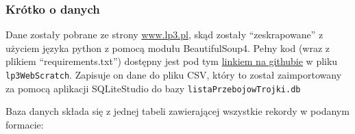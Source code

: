 \documentclass[11pt]{article}
\begin{document}
\hypertarget{kruxf3tko-o-danych}{%
\subsubsection{Krótko o danych}\label{kruxf3tko-o-danych}}

Dane zostały pobrane ze strony \href{https://www.lp3.pl/}{www.lp3.pl},
skąd zostały ``zeskrapowane'' z użyciem języka python z pomocą modułu
BeautifulSoup4. Pełny kod (wraz z plikiem ``requirements.txt'') dostępny
jest pod tym \href{https://github.com/pkrucz00/trojkaStats}{linkiem na
githubie} w pliku \texttt{lp3WebScratch}. Zapisuje on dane do pliku CSV,
który to został zaimportowany za pomocą aplikacji SQLiteStudio do bazy
\texttt{listaPrzebojowTrojki.db}

Baza danych składa się z jednej tabeli zawierającej wszystkie rekordy w
podanym formacie:
\end{document}
